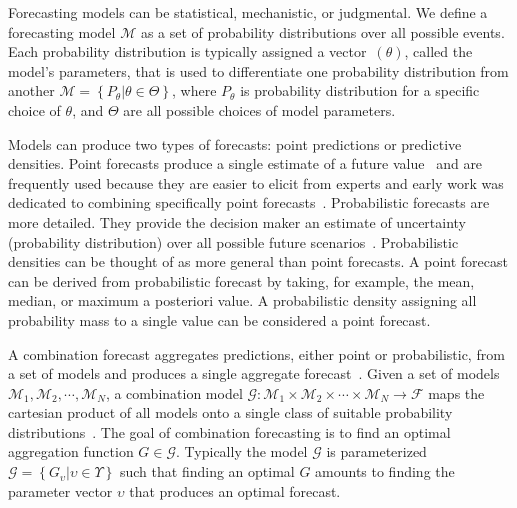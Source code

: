 \documentclass[preprint,authoryear]{elsarticle}
\def\l{\left}
\def\r{\right}
\begin{document}
Forecasting models can be statistical, mechanistic, or judgmental. 
We define a forecasting model $\mathcal{M}$ as a set of probability distributions over all possible events.
Each probability distribution is typically assigned a vector~$(\theta)$, called the model's parameters, that is used to differentiate one probability distribution from another
$\mathcal{M} = \l\{ P_{\theta} | \theta \in \Theta \r\}$,
where $P_{\theta}$ is probability distribution for a specific choice of $\theta$, and $\Theta$ are all possible choices of model parameters.

Models can produce two types of forecasts: point predictions or predictive densities. 
Point forecasts produce a single estimate of a future value~\citep{bates1969combination,granger1984improved} and are frequently used because they are easier to elicit from experts and early work was dedicated to combining specifically point forecasts~\cite{granger1984improved,bates1969combination,galton1907vox}.
Probabilistic forecasts are more detailed. 
They provide the decision maker an estimate of uncertainty (probability distribution) over all possible future scenarios~\citep{clemen1999combining,stone1961opinion,winkler1981combining,genest1986combining,winkler1968consensus,dawid1995coherent,ranjan2010combining,gneiting2013combining,hora2015calibration}. 
Probabilistic densities can be thought of as more general than point forecasts.
A point forecast can be derived from probabilistic forecast by taking, for example, the mean, median, or maximum a posteriori value.
A probabilistic density assigning all probability mass to a single value can be considered a point forecast.

A combination forecast aggregates predictions, either point or probabilistic, from a set of models and produces a single aggregate forecast~\citep{clemen1999combining,winkler1981combining,genest1986combining,winkler2019probability}.
Given a set of models $\mathcal{M}_{1},\mathcal{M}_{2},\cdots,\mathcal{M}_{N}$, a combination model $\mathcal{G}:\mathcal{M}_{1} \times \mathcal{M}_{2} \times \cdots \times \mathcal{M}_{N} \to \mathcal{F}$ maps the cartesian product of all models onto a single class of suitable probability distributions~\citep{gneiting2013combining}.
The goal of combination forecasting is to find an optimal aggregation function $G \in \mathcal{G}$.
Typically the model $\mathcal{G}$ is parameterized $\mathcal{G} = \l\{ G_{\upsilon} | \upsilon \in \Upsilon \r\} $ such that finding an optimal $G$ amounts to finding the parameter vector $\upsilon$ that produces an optimal forecast.
\end{document}
